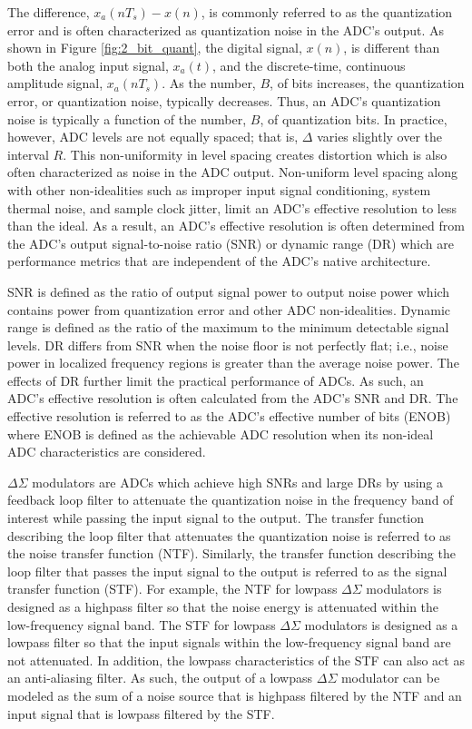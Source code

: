 The difference, $x_a(n T_s)-x(n)$, is commonly referred to as the quantization error and
is often characterized as quantization noise in the ADC's output. As shown in Figure
\ref{fig:2_bit_quant}, the digital signal, $x(n)$, is different than both the
analog input signal, $x_a(t)$, and the discrete-time, continuous amplitude signal, 
$x_a(n T_s)$. As the number, $B$, of bits increases, the quantization error, or 
quantization noise, typically decreases. Thus, an ADC's quantization noise is typically a
function of the number, $B$, of quantization bits. In practice, however, ADC levels are
not equally spaced; that is, $\Delta$ varies slightly over the interval $R$. This
non-uniformity in level spacing creates distortion which is also often characterized as
noise in the ADC output. Non-uniform level spacing along with other non-idealities such as
improper input signal conditioning, system thermal noise, and sample clock jitter, limit
an ADC's effective resolution to less than the ideal. As a result, an ADC's effective
resolution is often determined from the ADC's output signal-to-noise ratio (SNR) or
dynamic range (DR) which are performance metrics that are  independent of the ADC's native
architecture.

SNR is defined as the ratio of output signal power to output noise power which contains
power from quantization error and other ADC non-idealities. Dynamic range is defined as
the ratio of the maximum to the minimum detectable signal levels. DR differs from SNR when
the noise floor is not perfectly flat; i.e., noise power in localized frequency regions is
greater than the average noise power. The effects of DR further limit the practical
performance of ADCs. As such, an ADC's effective resolution is often calculated from
the ADC's SNR and DR. The effective resolution is referred to as the ADC's effective
number of bits (ENOB) where ENOB is defined as the achievable ADC resolution when its
non-ideal ADC characteristics are considered.

$\Delta\Sigma$ modulators are ADCs which achieve high SNRs and large DRs by using a
feedback loop filter to attenuate the quantization noise in the frequency band of
interest while passing the input signal to the output. The transfer function describing
the loop filter that attenuates the quantization noise is referred to as the noise
transfer function (NTF). Similarly, the transfer function describing the loop filter that
passes the input signal to the output is referred to as the signal transfer function
(STF).  For example, the NTF for lowpass $\Delta\Sigma$ modulators is designed as a
highpass filter so that the noise energy is attenuated within the low-frequency signal
band. The STF for lowpass $\Delta\Sigma$ modulators is designed as a lowpass
filter so that the input signals within the low-frequency signal band are not attenuated.
In addition, the lowpass characteristics of the STF can also act as an anti-aliasing
filter. As such, the output of a lowpass $\Delta\Sigma$ modulator can be modeled as the
sum of a noise source that is highpass filtered by the NTF and an input signal that is
lowpass filtered by the STF.

